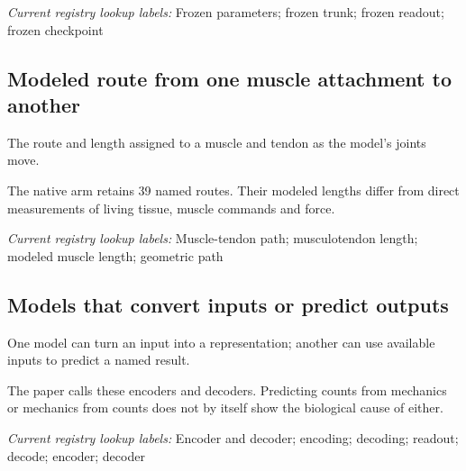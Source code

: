 \noindent\textit{Current registry lookup labels:} Frozen parameters; frozen trunk; frozen readout; frozen checkpoint\par

\begin{samepage}
\subsection*{Modeled route from one muscle attachment to another}
\noindent The route and length assigned to a muscle and tendon as the model’s joints move.\par
\end{samepage}
\begin{samepage}
\noindent The native arm retains 39 named routes. Their modeled lengths differ from direct measurements of living tissue, muscle commands and force.\par\nopagebreak[4]

\end{samepage}


\noindent\textit{Current registry lookup labels:} Muscle-tendon path; musculotendon length; modeled muscle length; geometric path\par

\begin{samepage}
\subsection*{Models that convert inputs or predict outputs}
\noindent One model can turn an input into a representation; another can use available inputs to predict a named result.\par
\end{samepage}
\begin{samepage}
\noindent The paper calls these encoders and decoders. Predicting counts from mechanics or mechanics from counts does not by itself show the biological cause of either.\par\nopagebreak[4]

\end{samepage}


\noindent\textit{Current registry lookup labels:} Encoder and decoder; encoding; decoding; readout; decode; encoder; decoder\par

